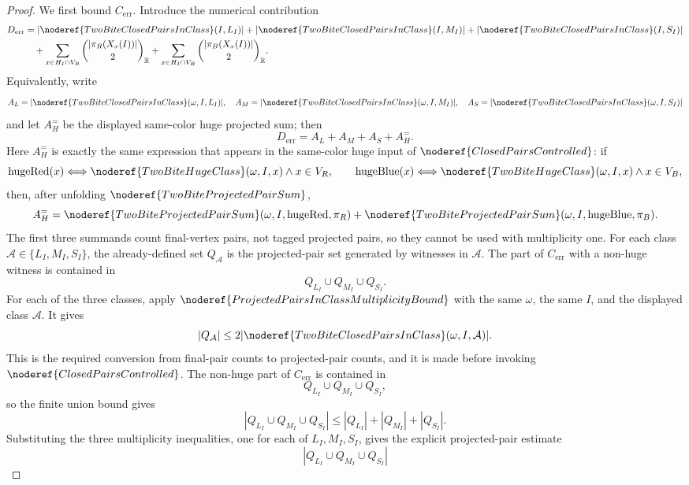 \begin{proof}
We first bound \(C_{\mathrm{err}}\).  Introduce the numerical contribution
\[
\begin{aligned}
D_{\mathrm{err}}
&=|\noderef{TwoBiteClosedPairsInClass}(I,L_I)|
  +|\noderef{TwoBiteClosedPairsInClass}(I,M_I)|
  +|\noderef{TwoBiteClosedPairsInClass}(I,S_I)|\\
&\quad+
\sum_{x\in H_I\cap V_R}
  \binom{|\pi_R(X_x(I))|}{2}_{\mathbb R}
+
\sum_{x\in H_I\cap V_B}
  \binom{|\pi_B(X_x(I))|}{2}_{\mathbb R}.
\end{aligned}
\]
Equivalently, write
\[
A_L=|\noderef{TwoBiteClosedPairsInClass}(\omega,I,L_I)|,\quad
A_M=|\noderef{TwoBiteClosedPairsInClass}(\omega,I,M_I)|,\quad
A_S=|\noderef{TwoBiteClosedPairsInClass}(\omega,I,S_I)|
\]
and let \(A_H^{=}\) be the displayed same-color huge projected sum; then
\[
D_{\mathrm{err}}=A_L+A_M+A_S+A_H^{=}.
\]
Here \(A_H^{=}\) is exactly the same expression that appears in the
same-color huge input of \(\noderef{ClosedPairsControlled}\): if
\[
\mathrm{hugeRed}(x)\Longleftrightarrow
\noderef{TwoBiteHugeClass}(\omega,I,x)\land x\in V_R,
\qquad
\mathrm{hugeBlue}(x)\Longleftrightarrow
\noderef{TwoBiteHugeClass}(\omega,I,x)\land x\in V_B,
\]
then, after unfolding \(\noderef{TwoBiteProjectedPairSum}\),
\[
A_H^{=}
=\noderef{TwoBiteProjectedPairSum}(\omega,I,\mathrm{hugeRed},\pi_R)
 +\noderef{TwoBiteProjectedPairSum}(\omega,I,\mathrm{hugeBlue},\pi_B).
\]
The first three summands count final-vertex pairs, not tagged projected pairs,
so they cannot be used with multiplicity one.  For each class
\(\mathcal A\in\{L_I,M_I,S_I\}\), the already-defined set
\(Q_{\mathcal A}\) is the projected-pair set generated by witnesses in
\(\mathcal A\).
The part of \(C_{\mathrm{err}}\) with a non-huge witness is contained in
\[
Q_{L_I}\cup Q_{M_I}\cup Q_{S_I}.
\]
For each of the three classes, apply
\(\noderef{ProjectedPairsInClassMultiplicityBound}\) with the same
\(\omega\), the same \(I\), and the displayed class \(\mathcal A\).  It gives
\[
|Q_{\mathcal A}|
\le
2|\noderef{TwoBiteClosedPairsInClass}(\omega,I,\mathcal A)|.
\]
This is the required conversion from final-pair counts to projected-pair
counts, and it is made before invoking \(\noderef{ClosedPairsControlled}\).
The non-huge part of \(C_{\mathrm{err}}\) is contained in
\[
Q_{L_I}\cup Q_{M_I}\cup Q_{S_I},
\]
so the finite union bound gives
\[
\left|Q_{L_I}\cup Q_{M_I}\cup Q_{S_I}\right|
\le |Q_{L_I}|+|Q_{M_I}|+|Q_{S_I}|.
\]
Substituting the three multiplicity inequalities, one for each of
\(L_I,M_I,S_I\), gives the explicit projected-pair estimate
\[
\left|Q_{L_I}\cup Q_{M_I}\cup Q_{S_I}\right|
\]
\end{proof}
